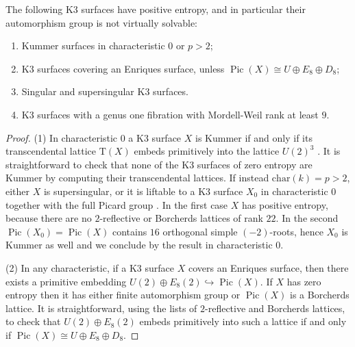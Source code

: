 \documentclass[11pt,letterpaper]{amsart}
\newcommand{\Si}[1]{\textcolor{blue}{(Si: #1)}}
\DeclareMathOperator{\Pic}{Pic}
\begin{document}
\begin{corollary} \label{cor:examples.positive.entropy}
The following K3 surfaces have positive entropy, and in particular their automorphism group is not virtually solvable:
\begin{enumerate}
    \item Kummer surfaces in characteristic $0$ or $p>2$;
    \item K3 surfaces covering an Enriques surface, unless $\Pic(X)\cong U\oplus E_8\oplus D_8$;
    \item Singular and supersingular K3 surfaces.
    \item K3 surfaces with a genus one fibration with Mordell-Weil rank at least $9$.
\end{enumerate}
\end{corollary}
\begin{proof}
 (1) In characteristic $0$ a K3 surface $X$ is Kummer if and only if its transcendental lattice $\mathrm{T}(X)$ embeds primitively into the lattice $U(2)^3$ \cite[Theorem~14.3.17]{huybrechts.K3}. It is straightforward to check that none of the K3 surfaces of zero entropy are Kummer by computing their transcendental lattices. If instead $\mathrm{char}(k)=p>2$, either $X$ is supersingular, or it is liftable to a K3 surface $X_0$ in characteristic $0$ together with the full Picard group \cite[Corollary~4.2]{lieblich.maulik}.
 In the first case $X$ has positive entropy, because there are no $2$-reflective or Borcherds lattices of rank $22$. In the second $\Pic(X_0)= \Pic(X)$ contains $16$ orthogonal simple $(-2)$-roots, hence $X_0$ is Kummer as well and we conclude by the result in characteristic $0$.
 
(2) In any characteristic, if a K3 surface $X$ covers an Enriques surface, then there exists a primitive embedding $U(2)\oplus E_8(2)\hookrightarrow \Pic(X)$. If $X$ has zero entropy then it has either finite automorphism group or $\Pic(X)$ is a Borcherds lattice. It is straightforward, using the lists of $2$-reflective and Borcherds lattices, to check that $U(2)\oplus E_8(2)$ embeds primitively into such a lattice if and only if $\Pic(X)\cong U \oplus E_8\oplus D_8$.
    

\end{proof}
\end{document}
